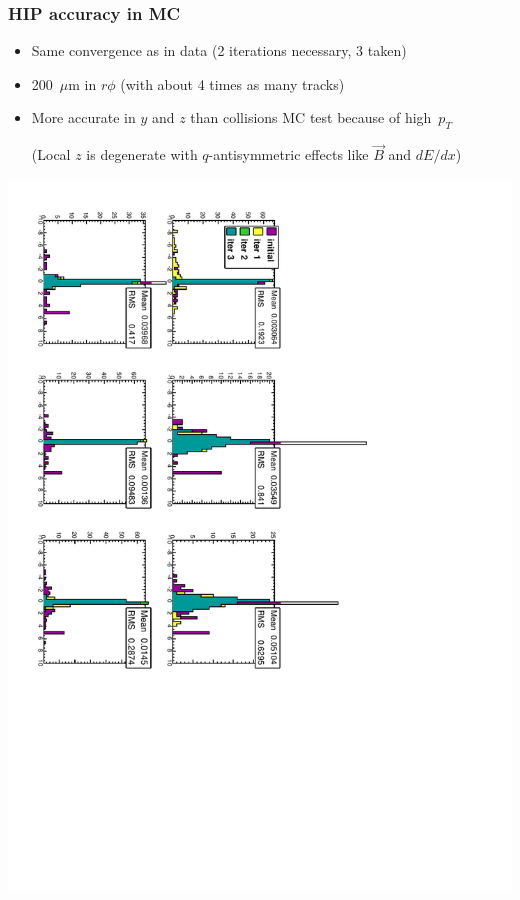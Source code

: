 \documentclass[compress]{beamer}
\begin{document}
\begin{frame}
\frametitle{HIP accuracy in MC}

\begin{itemize}
\item Same convergence as in data (2 iterations necessary, 3 taken)
\item 200~$\mu$m in $r\phi$ (with about 4 times as many tracks)
\item More accurate in $y$ and $z$ than collisions MC test because of \mbox{high $p_T$\hspace{-1 cm}}

\scriptsize (Local $z$ is degenerate with $q$-antisymmetric effects like $\vec{B}$ and $dE/dx$)
\end{itemize}

\vfill
\includegraphics[height=\linewidth, angle=90]{hip_MC.pdf}
\end{frame}
\end{document}
